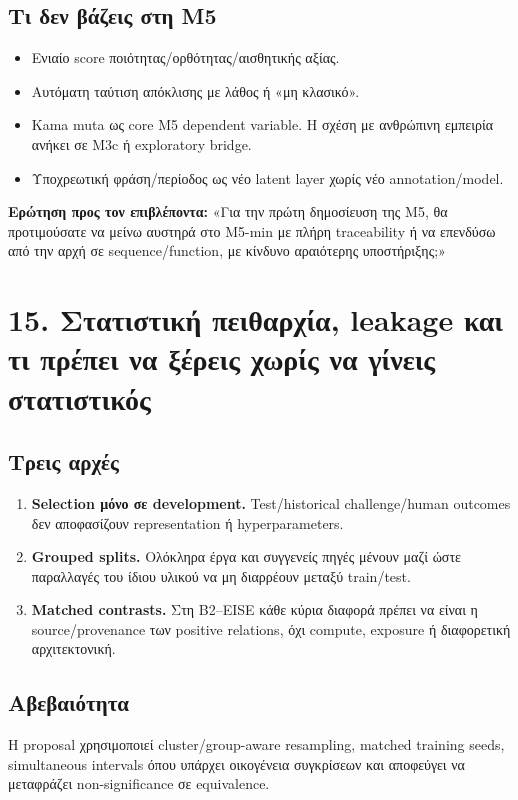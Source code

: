 \documentclass[9pt,a4paper]{extarticle}
\newcommand{\ask}[1]{\begin{warnbox}\textbf{Ερώτηση προς τον επιβλέποντα:} #1\end{warnbox}}
\begin{document}
\subsection*{Τι δεν βάζεις στη M5}
\begin{itemize}
\item Ενιαίο score ποιότητας/ορθότητας/αισθητικής αξίας.
\item Αυτόματη ταύτιση απόκλισης με λάθος ή «μη κλασικό».
\item Kama muta ως core M5 dependent variable. Η σχέση με ανθρώπινη εμπειρία ανήκει σε M3c ή exploratory bridge.
\item Υποχρεωτική φράση/περίοδος ως νέο latent layer χωρίς νέο annotation/model.
\end{itemize}

\ask{«Για την πρώτη δημοσίευση της M5, θα προτιμούσατε να μείνω αυστηρά στο M5-min με πλήρη traceability ή να επενδύσω από την αρχή σε sequence/function, με κίνδυνο αραιότερης υποστήριξης;»}

\newpage
\section*{15. Στατιστική πειθαρχία, leakage και τι πρέπει να ξέρεις χωρίς να γίνεις στατιστικός}

\subsection*{Τρεις αρχές}
\begin{enumerate}
\item \textbf{Selection μόνο σε development.} Test/historical challenge/human outcomes δεν αποφασίζουν representation ή hyperparameters.
\item \textbf{Grouped splits.} Ολόκληρα έργα και συγγενείς πηγές μένουν μαζί ώστε παραλλαγές του ίδιου υλικού να μη διαρρέουν μεταξύ train/test.
\item \textbf{Matched contrasts.} Στη B2--EISE κάθε κύρια διαφορά πρέπει να είναι η source/provenance των positive relations, όχι compute, exposure ή διαφορετική αρχιτεκτονική.
\end{enumerate}

\subsection*{Αβεβαιότητα}
Η proposal χρησιμοποιεί cluster/group-aware resampling, matched training seeds, simultaneous intervals όπου υπάρχει οικογένεια συγκρίσεων και αποφεύγει να μεταφράζει non-significance σε equivalence.
\end{document}
